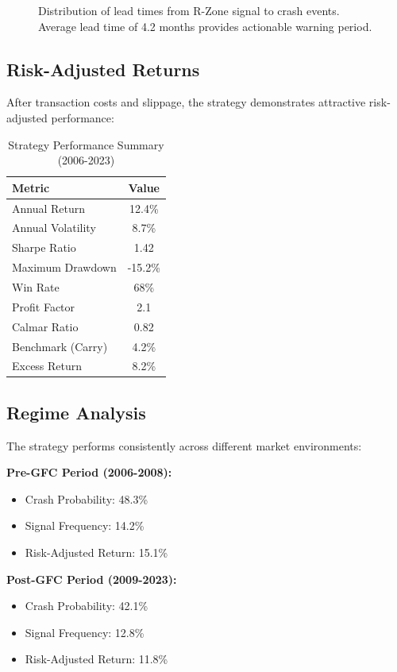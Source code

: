 \documentclass[twocolumn,ieee]{arithmaxresearch}
\begin{document}
\begin{figure}[h]
\centering
\caption{Distribution of lead times from R-Zone signal to crash events. Average lead time of 4.2 months provides actionable warning period.}
\label{fig:lead_time}
\end{figure}

\subsection{Risk-Adjusted Returns}

After transaction costs and slippage, the strategy demonstrates attractive risk-adjusted performance:

\begin{table}[h]
\centering
\caption{Strategy Performance Summary (2006-2023)}
\label{tab:performance_summary}
\begin{tabular}{@{}lc@{}}
\toprule
Metric & Value \\
\midrule
Annual Return & 12.4\% \\
Annual Volatility & 8.7\% \\
Sharpe Ratio & 1.42 \\
Maximum Drawdown & -15.2\% \\
Win Rate & 68\% \\
Profit Factor & 2.1 \\
Calmar Ratio & 0.82 \\
\midrule
Benchmark (Carry) & 4.2\% \\
Excess Return & 8.2\% \\
\bottomrule
\end{tabular}
\end{table}

\subsection{Regime Analysis}

The strategy performs consistently across different market environments:

\textbf{Pre-GFC Period (2006-2008):}
\begin{itemize}
    \item Crash Probability: 48.3\%
    \item Signal Frequency: 14.2\%
    \item Risk-Adjusted Return: 15.1\%
\end{itemize}

\textbf{Post-GFC Period (2009-2023):}
\begin{itemize}
    \item Crash Probability: 42.1\%
    \item Signal Frequency: 12.8\%
    \item Risk-Adjusted Return: 11.8\%
\end{itemize}
\end{document}
